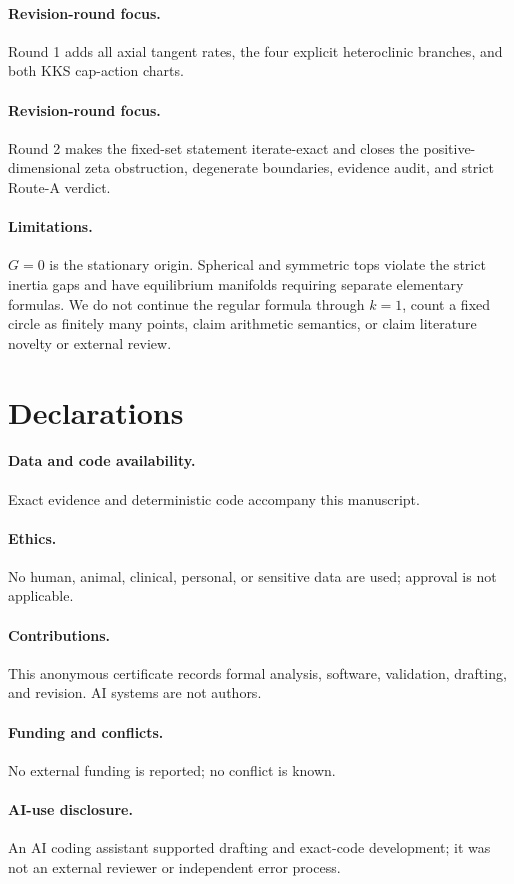 \documentclass[8pt]{extarticle}
\begin{document}
\paragraph{Revision-round focus.} Round 1 adds all axial tangent rates, the
four explicit heteroclinic branches, and both KKS cap-action charts.
\or
\paragraph{Revision-round focus.} Round 2 makes the fixed-set statement
iterate-exact and closes the positive-dimensional zeta obstruction,
degenerate boundaries, evidence audit, and strict Route-A verdict.
\fi

\paragraph{Limitations.}
$G=0$ is the stationary origin.  Spherical and symmetric tops violate the
strict inertia gaps and have equilibrium manifolds requiring separate
elementary formulas.  We do not continue the regular formula through
$k=1$, count a fixed circle as finitely many points, claim arithmetic
semantics, or claim literature novelty or external review.

\section*{Declarations}
\paragraph{Data and code availability.} Exact evidence and deterministic
code accompany this manuscript.
\paragraph{Ethics.} No human, animal, clinical, personal, or sensitive data
are used; approval is not applicable.
\paragraph{Contributions.} This anonymous certificate records formal analysis,
software, validation, drafting, and revision. AI systems are not authors.
\paragraph{Funding and conflicts.} No external funding is reported; no
conflict is known.
\paragraph{AI-use disclosure.} An AI coding assistant supported drafting and
exact-code development; it was not an external reviewer or independent error
process.
\end{document}
